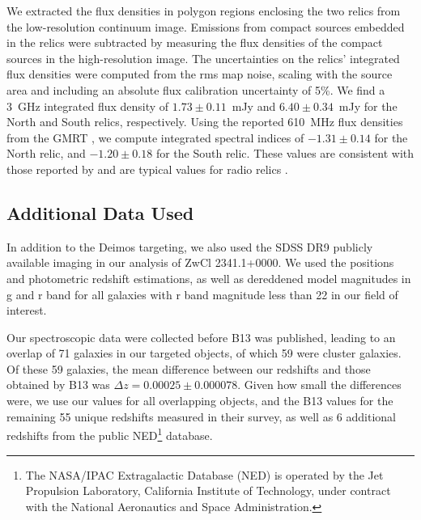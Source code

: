 \documentclass[onecolumn]{aastex}
\begin{document}
We extracted the flux densities in polygon regions enclosing the two relics from the low-resolution continuum image.  Emissions from compact sources embedded in the relics were subtracted by measuring the flux densities of the compact sources in the high-resolution image.  The uncertainties on the relics’ integrated flux densities were computed from the rms map noise, scaling with the source area and including an absolute flux calibration uncertainty of 5\%.  We find a 3~GHz integrated flux density of $1.73 \pm 0.11$~mJy and $6.40\pm 0.34$~mJy for the North and South relics, respectively.  Using the reported 610~MHz flux densities from the GMRT \citep{vanWeeren09}, we compute integrated spectral indices of $-1.31\pm0.14$ for the North relic, and $-1.20\pm 0.18$ for the South relic.  These values are consistent with those reported by \cite{Giovannini10} and are typical values for radio relics \citep[e.g.,][]{vanWeeren09-2,Kale12,Stroe13,Hindson14}.

\subsection{Additional Data Used}
In addition to the Deimos targeting, we also used the SDSS DR9 \citep{Ahn12} publicly available imaging in our analysis of ZwCl 2341.1+0000.  We used the positions and photometric redshift estimations, as well as dereddened model magnitudes in g and r band for all galaxies with r band magnitude less than 22 in our field of interest.

Our spectroscopic data were collected before B13 was published, leading to an overlap of 71 galaxies in our targeted objects, of which 59 were cluster galaxies.  Of these 59 galaxies, the mean difference between our redshifts and those obtained by B13 was $\Delta z = 0.00025 \pm 0.000078$.  Given how small the differences were, we use our values for all overlapping objects, and the B13 values for the remaining 55 unique redshifts measured in their survey, as well as 6 additional redshifts from the public NED\footnote{The NASA/IPAC Extragalactic Database (NED)
is operated by the Jet Propulsion Laboratory, California Institute of Technology,
under contract with the National Aeronautics and Space Administration.} database.
\end{document}
